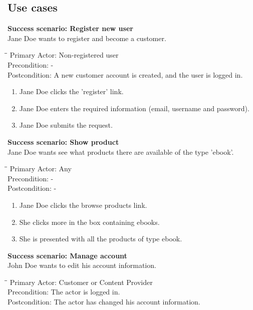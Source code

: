 \subsection{Use cases}
\label{Apendix_usecases}
\textbf{Success scenario: Register new user} \\
Jane Doe wants to register and become a customer. 
\begin{tabbing}
\hspace{5mm}\=\hspace{28mm}\=\kill
\>Primary Actor:\> Non-registered user\\
\>Precondition:\> -\\
\>Postcondition:\> A new customer account is created, and the user is logged in.
\end{tabbing}
\begin{enumerate} \setlength{\itemsep}{-1mm}
	\item Jane Doe clicks the 'register' link.
	\item Jane Doe enters the required information (email, username and password).
	\item Jane Doe submits the request.
\end{enumerate}
\vspace{3mm}
\textbf{Success scenario: Show product} \\
Jane Doe wants see what products there are available of the type 'ebook'.
\begin{tabbing}
\hspace{5mm}\=\hspace{26mm}\=\kill
\>Primary Actor:\> Any\\
\>Precondition:\> -\\
\>Postcondition:\> -
\end{tabbing}
\begin{enumerate} \setlength{\itemsep}{-1mm}
	\item Jane Doe clicks the browse products link.
	\item She clicks more in the box containing ebooks.
	\item She is presented with all the products of type ebook.
\end{enumerate}
\vspace{3mm}
\textbf{Success scenario: Manage account} \\
John Doe wants to edit his account information.
\begin{tabbing}
\hspace{5mm}\=\hspace{26mm}\=\kill
\>Primary Actor:\> Customer or Content Provider\\
\>Precondition:\> The actor is logged in.\\
\>Postcondition:\> The actor has changed his account information.
\end{tabbing}
